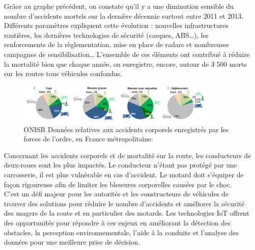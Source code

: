 Grâce au graphe précédent, on constate qu’il y a une diminution sensible du nombre d’accidents mortels sur la dernière décennie surtout entre 2011 et 2013. Différents paramètres expliquent cette évolution : nouvelles infrastructures routières, les dernières technologies de sécurité (casques, ABS…), les renforcements de la règlementation, mise en place de radars et nombreuses campagnes de sensibilisation… L’ensemble de ces éléments ont contribué à réduire la mortalité bien que chaque année, on enregistre, encore, autour de 3 500 morts sur les routes tous véhicules confondus. 

\begin{figure}[H]
    \centering
    \includegraphics[width=0.9\textwidth]{images/camambert_accidents_differents_vehicules.png} 
    \caption{ONISR Données relatives aux accidents corporels enregistrés par les forces de l'ordre, en France métropolitaine.}
\end{figure}

Concernant les accidents corporels et de mortalité sur la route, les conducteurs de deux-roues sont les plus impactés. Le conducteur n’étant pas protégé par une carrosserie, il est plus vulnérable en cas d’accident. Le motard doit s’équiper de façon rigoureuse afin de limiter les blessures corporelles causées par le choc.\\
C'est un défi majeur pour les autorités et les constructeurs de véhicules de trouver des solutions pour réduire le nombre d'accidents et améliorer la sécurité des usagers de la route et en particulier des motards. Les technologies IoT offrent des opportunités pour répondre à ces enjeux en améliorant la détection des obstacles, la perception environnementale, l'aide à la conduite et l'analyse des données pour une meilleure prise de décision.\\


